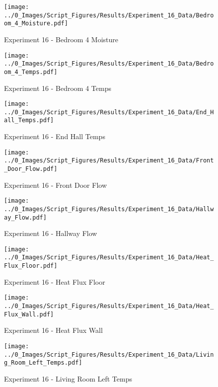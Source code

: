 	\begin{figure}[H]
		\centering
		\texttt{[image: ../0\_Images/Script\_Figures/Results/Experiment\_16\_Data/Bedroom\_4\_Moisture.pdf]}
		\caption[]{Experiment 16 - Bedroom 4 Moisture}
	\end{figure}
 
	\clearpage

	\begin{figure}[H]
		\centering
		\texttt{[image: ../0\_Images/Script\_Figures/Results/Experiment\_16\_Data/Bedroom\_4\_Temps.pdf]}
		\caption[]{Experiment 16 - Bedroom 4 Temps}
	\end{figure}
 

	\begin{figure}[H]
		\centering
		\texttt{[image: ../0\_Images/Script\_Figures/Results/Experiment\_16\_Data/End\_Hall\_Temps.pdf]}
		\caption[]{Experiment 16 - End Hall Temps}
	\end{figure}
 
	\clearpage

	\begin{figure}[H]
		\centering
		\texttt{[image: ../0\_Images/Script\_Figures/Results/Experiment\_16\_Data/Front\_Door\_Flow.pdf]}
		\caption[]{Experiment 16 - Front Door Flow}
	\end{figure}
 

	\begin{figure}[H]
		\centering
		\texttt{[image: ../0\_Images/Script\_Figures/Results/Experiment\_16\_Data/Hallway\_Flow.pdf]}
		\caption[]{Experiment 16 - Hallway Flow}
	\end{figure}
 
	\clearpage

	\begin{figure}[H]
		\centering
		\texttt{[image: ../0\_Images/Script\_Figures/Results/Experiment\_16\_Data/Heat\_Flux\_Floor.pdf]}
		\caption[]{Experiment 16 - Heat Flux Floor}
	\end{figure}
 

	\begin{figure}[H]
		\centering
		\texttt{[image: ../0\_Images/Script\_Figures/Results/Experiment\_16\_Data/Heat\_Flux\_Wall.pdf]}
		\caption[]{Experiment 16 - Heat Flux Wall}
	\end{figure}
 
	\clearpage

	\begin{figure}[H]
		\centering
		\texttt{[image: ../0\_Images/Script\_Figures/Results/Experiment\_16\_Data/Living\_Room\_Left\_Temps.pdf]}
		\caption[]{Experiment 16 - Living Room Left Temps}
	\end{figure}
 

